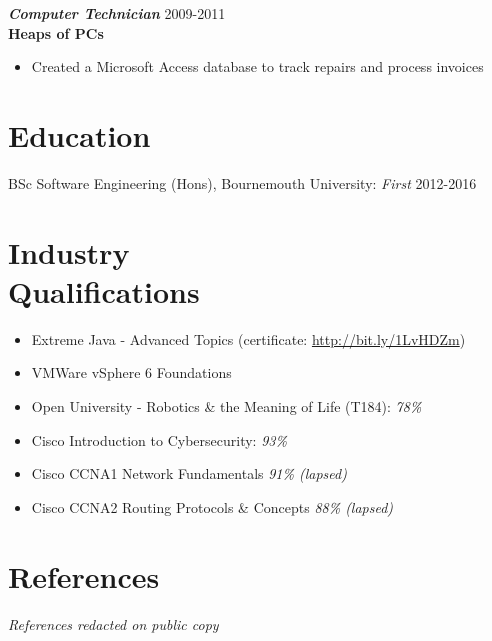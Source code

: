 \documentclass[margin, 10pt]{res} %
\begin{document}
\begin{resume}
{\sl \textbf{Computer Technician}} \hfill 2009-2011\\
\textbf{Heaps of PCs}
\begin{itemize} 
\item Created a Microsoft Access database to track repairs and process invoices
\end{itemize} 



\section{Education}
BSc Software Engineering (Hons), Bournemouth University: {\sl First} \hfill 2012-2016


\section{Industry \\Qualifications} 
\begin{itemize} 
\item Extreme Java - Advanced Topics (certificate: \href{http://bit.ly/1LvHDZm}{http://bit.ly/1LvHDZm})
\item VMWare vSphere 6 Foundations
\item Open University - Robotics \& the Meaning of Life (T184): {\sl 78\%}
\item Cisco Introduction to Cybersecurity: {\sl 93\%}
\item Cisco CCNA1 Network Fundamentals {\sl 91\% (lapsed)}
\item Cisco CCNA2 Routing Protocols \& Concepts {\sl 88\% (lapsed)}
\end{itemize} 
 
\section{References}
{\sl References redacted on public copy}


\end{resume}
\end{document}
